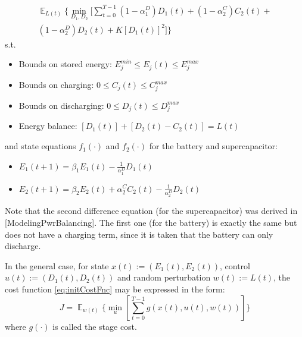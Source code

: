 \documentclass[conference]{IEEEtran}
\DeclareMathOperator{\E}{\mathbb{E}}
\begin{document}
\begin{multline} \label{eq:initCostFnc}
    \mathop{\E}_{L(t)} \Biggl\{\min_{D_{1},D_{2}}[\sum_{t=0}^{T-1}
	(1-\alpha_{1}^{D})D_{1}(t)+
	(1-\alpha_{2}^{C})C_{2}(t)+\\
	(1-\alpha_{2}^{D})D_{2}(t)+
	K\left[D_{1}(t)\right]^{2}
	]\Biggr\}\end{multline}
s.t.
\begin{itemize}
    \item Bounds on stored energy: 
	\begin{math}E_{j}^{min}\leq E_{j}(t)\leq E_{j}^{max}\end{math}
	\item Bounds on charging:
	\begin{math}0\leq C_{j}(t)\leq C_{j}^{max}\end{math}
	\item Bounds on discharging:
	\begin{math}0\leq D_{j}(t)\leq D_{j}^{max}\end{math}
	\item Energy balance:
	\begin{math}\left[D_{1}(t)\right] + \left[D_{2}(t) - C_{2}(t)\right] = L(t)\end{math}
\end{itemize}
and state equations $f_{1}(\cdot)$ and $f_{2}(\cdot)$ for the battery and supercapacitor:
\begin{itemize}
    \item \begin{math}E_{1}(t+1)=\beta_{1}E_{1}(t)-\frac{1}{\alpha_{1}^{D}}D_{1}(t)\end{math}
    \item \begin{math}E_{2}(t+1)=\beta_{2}E_{2}(t)+\alpha_{2}^{C}C_{2}(t)-\frac{1}{\alpha_{2}^{D}}D_{2}(t)\end{math}\newline
\end{itemize}
Note that the second difference equation (for the supercapacitor) was derived in [ModelingPwrBalancing]. The first one (for the battery) is exactly the same but does not have a charging term, since it is taken that the battery can only discharge.

In the general case, for state $x(t):= (E_{1}(t),E_{2}(t))$, control $u(t):= (D_{1}(t),D_{2}(t))$ and random perturbation $w(t):= L(t)$, the cost function \eqref{eq:initCostFnc} may be expressed in the form:
\begin{equation}J=\mathop{\E}_{w(t)} \Biggl\{\min_{u}\left[\sum_{t=0}^{T-1}g(x(t),u(t),w(t))\right]\Biggr\}\end{equation}
where $g(\cdot)$ is called the stage cost.
\end{document}
